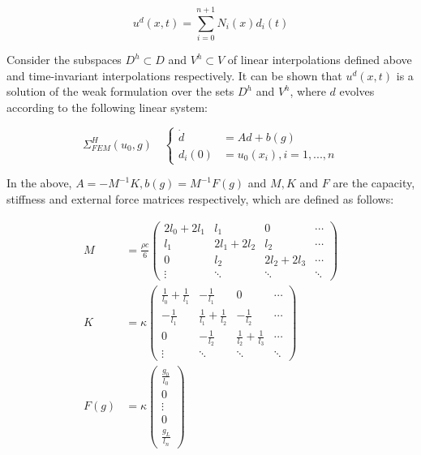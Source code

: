 \documentclass[letterpaper, 10 pt, conference]{ieeeconf/ieeeconf}
\begin{document}
\begin{equation}
    u^d(x, t) = \sum_{i=0}^{n+1} N_i(x) d_i(t)
\end{equation}

Consider the subspaces $D^h \subset D$ and $V^h \subset V$ of linear
interpolations defined above and time-invariant interpolations respectively.
It can be shown that $u^d(x, t)$ is a solution of the weak formulation over the
sets $D^h$ and $V^h$, where $d$ evolves
according to the following linear system:

\begin{equation}\label{eq:fem}
    \Sigma^H_{FEM}(u_0, g) \quad \left \{
    \begin{aligned}
        \dot{d} &= A d + b(g) \\
        d_i(0) &= u_0(x_i), i = 1,...,n
    \end{aligned}
    \right.
\end{equation}

In the above, $A = -M^{-1}K, b(g) = M^{-1} F(g)$ and $M, K$ and $F$ are the capacity,
stiffness and external force matrices respectively, which are defined as
follows:

    \begin{align}
        M &= \frac{\rho c}{6} \begin{pmatrix}
            2 l_0 + 2 l_1 & l_1  & 0 & \cdots \\ 
            l_1 & 2 l_1 + 2 l_2 & l_2  & \cdots \\ 
            0 & l_2 & 2 l_2 + 2 l_3 &  \cdots \\ 
            \vdots & \ddots & \ddots & \ddots 
        \end{pmatrix} \label{eq:matrices_M} \\
        K &= \kappa \begin{pmatrix}
            \frac{1}{l_0} + \frac{1}{l_1} & -\frac{1}{l_1}  & 0 & \cdots \\ 
            -\frac{1}{l_1} & \frac{1}{l_1} + \frac{1}{l_2} & -\frac{1}{l_2}  & \cdots \\ 
            0 & -\frac{1}{l_2} & \frac{1}{l_2} + \frac{1}{l_3} &  \cdots \\ 
            \vdots & \ddots & \ddots & \ddots 
        \end{pmatrix} \label{eq:matrices_K}\\
        F(g) &= \kappa \begin{pmatrix}
            \frac{g_0}{l_0} \\
            0 \\
            \vdots \\
            0 \\
            \frac{g_L}{l_n}
        \end{pmatrix} \label{eq:matrices_F}
    \end{align}
\end{document}
